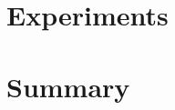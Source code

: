 \documentclass[12pt,a4paper,openany]{book}
\begin{document}
\chapter{Experiments}
\chapter{Summary}










































\end{document}
